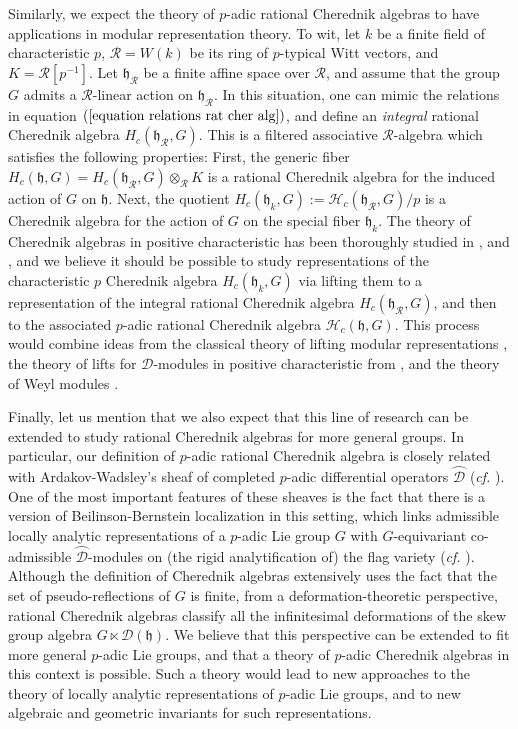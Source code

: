 \documentclass{amsart}
\newcommand{\D}{\mathcal{D}}
\begin{document}
Similarly, we expect the theory of $p$-adic rational Cherednik algebras to have applications in modular representation theory. To wit, let $k$ be a finite field of characteristic $p$, $\mathcal{R}=W(k)$ be its ring of $p$-typical Witt vectors, and $K=\mathcal{R}[p^{-1}]$. Let $\mathfrak{h}_{\mathcal{R}}$ be a finite affine space over $\mathcal{R}$, and assume that the group  $G$ admits a $\mathcal{R}$-linear action on $\mathfrak{h}_{\mathcal{R}}$. In this situation, one can mimic the relations in equation $(\ref{equation relations rat cher alg})$, and define an \emph{integral} rational Cherednik algebra $H_c(\mathfrak{h}_{\mathcal{R}},G)$. This is a filtered associative $\mathcal{R}$-algebra which satisfies the following properties: First, the generic fiber $H_c(\mathfrak{h},G)=H_c(\mathfrak{h}_{\mathcal{R}},G)\otimes_{\mathcal{R}}K$ is a rational Cherednik algebra for the induced action of $G$ on $\mathfrak{h}$. Next, the quotient $H_c(\mathfrak{h}_k,G):=\mathcal{H}_c(\mathfrak{h}_{\mathcal{R}},G)/p$ is a Cherednik algebra for the action of $G$ on the special fiber $\mathfrak{h}_{k}$. The theory of Cherednik algebras in positive characteristic has been thoroughly studied in \cite{cherposchar1}, and \cite{cherposchar2}, and we believe it should be possible to study representations of the characteristic $p$ Cherednik algebra $H_c(\mathfrak{h}_k,G)$ via lifting them to a representation of the integral rational Cherednik algebra $H_c(\mathfrak{h}_{\mathcal{R}},G)$, and then to the associated $p$-adic rational Cherednik algebra $\mathcal{H}_c(\mathfrak{h},G)$. This process would combine ideas from the classical theory of lifting modular representations \cite{schneidermodular}, the theory of lifts for $\D$-modules in positive characteristic from \cite{liftingDmod}, and the theory of Weyl modules \cite{jantz}.\bigskip

Finally, let us mention that we also expect that this line of research can be extended to study rational Cherednik algebras for more general groups. In particular, our definition of $p$-adic rational Cherednik algebra is closely related with Ardakov-Wadsley's sheaf of completed $p$-adic differential operators $\wideparen{\D}$ 
(\emph{cf.} \cite{ardakov2019}). One of the most important features of these sheaves is the fact that there is a version of Beilinson-Bernstein localization in this setting, which links admissible locally analytic representations of a $p$-adic Lie group $G$ with $G$-equivariant co-admissible $\wideparen{\D}$-modules on (the rigid analytification of) the flag variety (\emph{cf.} \cite{ardakovequivariant}).\\
Although the definition of Cherednik algebras extensively uses the fact that the set of pseudo-reflections of $G$ is finite, from a deformation-theoretic perspective, rational Cherednik algebras classify all the  infinitesimal deformations of the skew group algebra $G\ltimes \D(\mathfrak{h})$. We believe that this perspective can be extended to fit more general $p$-adic Lie groups, and that a theory of $p$-adic Cherednik algebras in this context is possible. Such a theory would lead to new approaches to the theory of locally analytic representations of $p$-adic Lie groups, and to new algebraic and geometric invariants for such representations.
\end{document}
